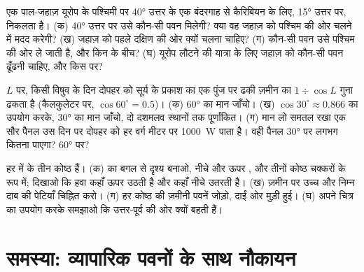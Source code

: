 \begin{exercise}[$\star\star$]\label{exo:g8:winds-global-circulation:10}
एक पाल-जहाज़ यूरोप के पश्चिमी  पर \ang{40} उत्तर के एक बंदरगाह से कैरिबियन के लिए,
\ang{15} उत्तर पर, निकलता है। (क) \ang{40} उत्तर पर उसे कौन-सी पवन मिलेगी? क्या वह जहाज़
को पश्चिम की ओर चलने में मदद करेगी? (ख) जहाज़ को पहले दक्षिण की ओर क्यों चलना
चाहिए? (ग) कौन-सी पवन उसे पश्चिम की ओर ले जाती है, और किन  के बीच?
(घ) यूरोप लौटने की यात्रा के लिए जहाज़ को कौन-सी पवन ढूँढनी चाहिए, और किस 
पर?
\end{exercise}

\begin{exercise}[$\star\star\star$]\label{exo:g8:winds-global-circulation:11}
 $L$ पर, किसी विषुव के दिन दोपहर को सूर्य के प्रकाश का एक पुंज  पर
ढकी ज़मीन का $1 \div
\cos L$ गुना ढकता है (कैलकुलेटर पर, $\cos 60^\circ = 0.5$)।
(क) \ang{60} का मान जाँचो। (ख) $\cos 30^\circ \approx 0.866$ का उपयोग करके,
\ang{30} का मान जाँचो, दो दशमलव स्थानों तक पूर्णांकित। (ग) मान लो समतल रखा एक सौर
पैनल उस दिन  पर दोपहर को हर वर्ग मीटर पर \qty{1000}{W} पाता है। वही
पैनल \ang{30} पर लगभग कितना पाएगा? \ang{60} पर?
\end{exercise}

\begin{exercise}[$\star\star\star$]\label{exo:g8:winds-global-circulation:12}
हर  में  के तीन कोष्ठ हैं। (क)  का बगल से दृश्य
बनाओ, नीचे  और ऊपर , और तीनों कोष्ठ चक्करों के रूप में; दिखाओ कि हवा
कहाँ ऊपर उठती है और कहाँ नीचे उतरती है। (ख) ज़मीन पर उच्च और निम्न दाब की पेटियाँ
चिह्नित करो। (ग) हर कोष्ठ की ज़मीनी पवनें जोड़ो, दाईं ओर मुड़ी हुई। (घ) अपने चित्र
का उपयोग करके समझाओ कि  उत्तर-पूर्व की ओर क्यों बहती
हैं।
\end{exercise}

\section{समस्या: व्यापारिक पवनों के साथ नौकायन}

